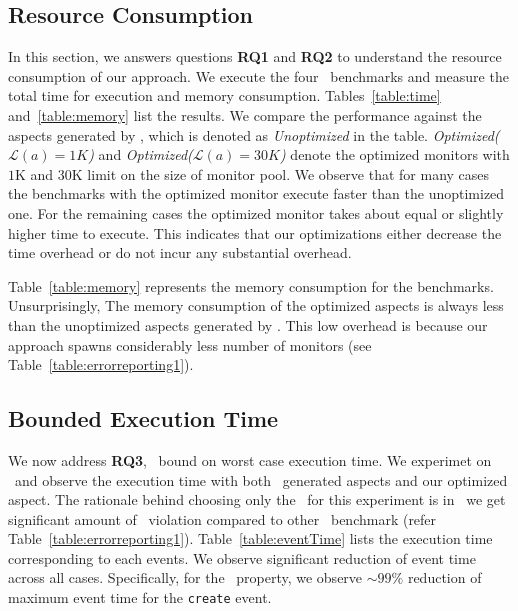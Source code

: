 
\subsection{Resource Consumption}
\label{sec:evaluation:resource}


In this section, we answers questions \textbf{RQ1} and \textbf{RQ2} to 
understand the resource consumption of our approach. We execute the four 
\dacapo\ benchmarks and measure the total time for execution and memory 
consumption. Tables~\ref{table:time} and~\ref{table:memory} list the results.
We compare the performance against the aspects generated by \javamop, which is 
denoted as \emph{Unoptimized} in the table. \emph{Optimized($\mathcal{L}(a) = 1K$)} 
and \emph{Optimized($\mathcal{L}(a) = 30K$)} denote the optimized monitors with 
$1$K and $30$K limit on the size of monitor pool. We observe that for many cases 
the benchmarks with the optimized monitor execute faster than the unoptimized one.
For the remaining cases the optimized monitor takes  about equal or slightly higher
time to execute. This indicates that
our optimizations either decrease the time overhead or do not incur any substantial
overhead. 

Table~\ref{table:memory} represents the memory 
consumption for the benchmarks. Unsurprisingly, The memory consumption of the optimized aspects 
is always less than the unoptimized aspects generated by \javamop. This low 
overhead is because our approach spawns considerably less number of 
monitors (see Table~\ref{table:errorreporting1}).

\subsection{Bounded Execution Time}
\label{sec:evaluation:bounded}

We now address \textbf{RQ3}, \ie\ bound on worst case execution time. We
experimet on \bloat\ and observe the execution time with both
\javamop\ generated aspects and our optimized aspect. The rationale behind choosing
only the \bloat\ for this experiment is in \bloat\ we get significant amount of
\hasnext\ violation compared to other \dacapo\ benchmark (refer Table~\ref{table:errorreporting1}). 
Table~\ref{table:eventTime} lists  the execution time corresponding to each
events. We observe significant reduction of event time across all cases.
Specifically, for the \hasnext\ property, we observe $\sim$$99\%$ reduction
of maximum event time for the \texttt{create} event.


